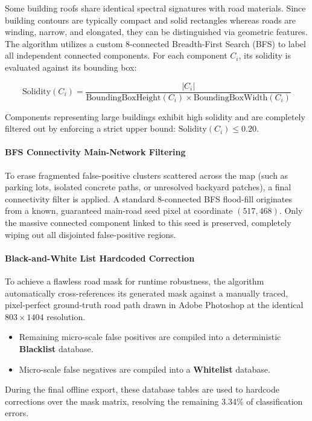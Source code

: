 \documentclass[12pt,a4paper]{ctexart}
\begin{document}
Some building roofs share identical spectral signatures with road materials. Since building contours are typically compact and solid rectangles whereas roads are winding, narrow, and elongated, they can be distinguished via geometric features. The algorithm utilizes a custom 8-connected Breadth-First Search (BFS) to label all independent connected components. For each component $C_i$, its solidity is evaluated against its bounding box:

\[
\text{Solidity}(C_i) = \frac{|C_i|}{\text{BoundingBoxHeight}(C_i) \times \text{BoundingBoxWidth}(C_i)}
\]

Components representing large buildings exhibit high solidity and are completely filtered out by enforcing a strict upper bound: $\text{Solidity}(C_i) \le 0.20$.

\paragraph{BFS Connectivity Main-Network Filtering}

To erase fragmented false-positive clusters scattered across the map (such as parking lots, isolated concrete paths, or unresolved backyard patches), a final connectivity filter is applied. A standard 8-connected BFS flood-fill originates from a known, guaranteed main-road seed pixel at coordinate $(517, 468)$. Only the massive connected component linked to this seed is preserved, completely wiping out all disjointed false-positive regions.

\paragraph{Black-and-White List Hardcoded Correction}

To achieve a flawless road mask for runtime robustness, the algorithm automatically cross-references its generated mask against a manually traced, pixel-perfect ground-truth road path drawn in Adobe Photoshop at the identical $803 \times 1404$ resolution.

\begin{itemize}
  \item Remaining micro-scale false positives are compiled into a deterministic \textbf{Blacklist} database.
  \item Micro-scale false negatives are compiled into a \textbf{Whitelist} database.
\end{itemize}

During the final offline export, these database tables are used to hardcode corrections over the mask matrix, resolving the remaining 3.34\% of classification errors.
\end{document}
